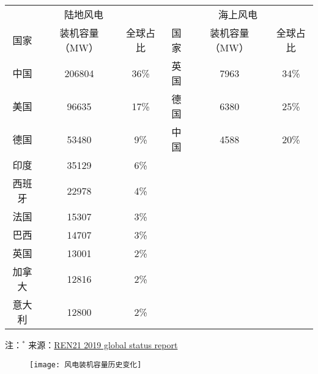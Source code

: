 \begin{table}[!htbp]
    \label{tab:windcapacitybycountry}
    \centering
    \small%
    \setlength{\tabcolsep}{5 pt}%
    \renewcommand{\arraystretch}{1.0}%
    \begin{tabular}{cccccc}
        \hline
         \multicolumn{3}{c}{陆地风电} &  \multicolumn{3}{c}{海上风电} \\
         国家 & 装机容量（MW） & 全球占比 & 国家 & 装机容量（MW） & 全球占比 \\
        \hline
        中国 & 206804 & 36\% & 英国 & 7963 & 34\% \\
        美国 & 96635 & 17\% & 德国 & 6380 & 25\% \\
        德国 & 53480 & 9\% & 中国 & 4588 & 20\% \\
        印度 & 35129 & 6\% & & & \\
        西班牙 & 22978 & 4\% & & & \\
        法国 & 15307 & 3\% & & & \\
        巴西 & 14707 & 3\% & & & \\
        英国 & 13001 & 2\% & & & \\
        加拿大 & 12816 & 2\% & & & \\
        意大利 & 12800 & 2\% & & & \\
        \hline
    \end{tabular}
    
     \vspace*{3ex}  
      
    \begin{minipage}{0.8\textwidth}%
    注：$^*$ 来源：\href{https://www.ren21.net/wp-content/uploads/2019/05/gsr_2019_full_report_en.pdf}{REN21 2019 global status report} 
    \end{minipage}
\end{table}

\begin{figure}[!htbp]
    \centering
    \texttt{[image: 风电装机容量历史变化]}
    \label{fig:windcapacityhistory}
\end{figure}

